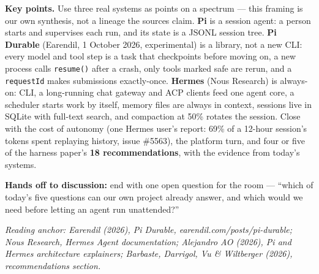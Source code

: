 \documentclass[12pt,a4paper]{article}
\newcommand{\source}[1]{\par\textcolor{teal!70!black}{\textit{Reading anchor: #1}}\par}
\begin{document}
\textbf{Key points.} Use three real systems as points on a spectrum --- this framing is our own synthesis, not a lineage the sources claim. \textbf{Pi} is a session agent: a person starts and supervises each run, and its state is a JSONL session tree. \textbf{Pi Durable} (Earendil, 1 October 2026, experimental) is a library, not a new CLI: every model and tool step is a task that checkpoints before moving on, a new process calls \texttt{resume()} after a crash, only tools marked safe are rerun, and a \texttt{requestId} makes submissions exactly-once. \textbf{Hermes} (Nous Research) is always-on: CLI, a long-running chat gateway and ACP clients feed one agent core, a scheduler starts work by itself, memory files are always in context, sessions live in SQLite with full-text search, and compaction at 50\% rotates the session. Close with the cost of autonomy (one Hermes user's report: 69\% of a 12-hour session's tokens spent replaying history, issue \#5563), the platform turn, and four or five of the harness paper's \textbf{18 recommendations}, with the evidence from today's systems.

\textbf{Hands off to discussion:} end with one open question for the room --- ``which of today's five questions can our own project already answer, and which would we need before letting an agent run unattended?''

\source{Earendil (2026), \emph{Pi Durable}, earendil.com/posts/pi-durable; Nous Research, Hermes Agent documentation; Alejandro AO (2026), Pi and Hermes architecture explainers; Barbaste, Darrigol, Vu \& Wiltberger (2026), recommendations section.}
\end{document}
